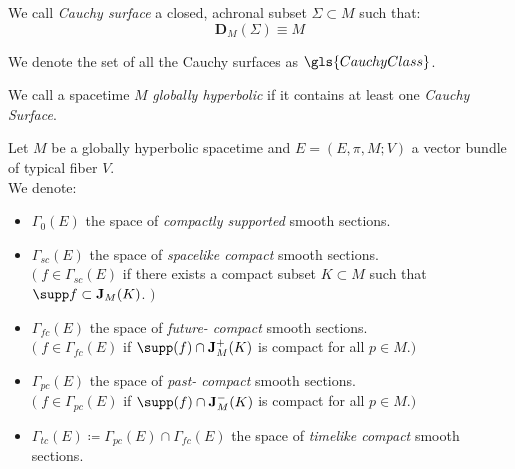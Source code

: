 \documentclass[a4paper,10pt,smallheadings]{scrartcl}
\begin{document}
			\begin{definition}
				We call \emph{Cauchy surface} a closed, achronal subset $\Sigma \subset M$ such that:
				\begin{displaymath}
					\mathbf{D}_M(\Sigma) \equiv M
				\end{displaymath}
			\end{definition}
			
			\begin{notationfix}
				We denote the set of all the Cauchy surfaces as $\gls{CauchyClass}$.
			\end{notationfix}
			
		\begin{definition}\label{Def:GHSP}
			We call a spacetime $M$ \emph{globally hyperbolic} if it contains at least one \emph{Cauchy Surface}.
		\end{definition}					

			\begin{notationfix}
				Let $M$ be a globally hyperbolic spacetime and $E=(E,\pi,M;V)$ a vector bundle of typical fiber $V$.\\
				We denote:
				\begin{itemize}
							\renewcommand\labelitemi{$\cdot$}
					\item $\Gamma_0(E)$ the space of \emph{compactly supported} smooth sections.
					\item $\Gamma_{sc}(E)$  the space of \emph{spacelike compact} smooth sections.\\
						$\big(\; f\in \Gamma_{sc}(E)$ if there exists a compact subset $K \subset M$  such that $\supp f \subset \mathbf{J}_M(K)$. $\big)$
					\item  $\Gamma_{fc}(E) $ the space of \emph{future- compact} smooth sections.\\
						$\big(\; f\in \Gamma_{fc}(E) $ if  $\supp(f) \cap  \mathbf{J}^+_M(K)$ is compact for all $p\in M$.$\big)$
					\item  $\Gamma_{pc}(E) $ the space of \emph{past- compact} smooth sections.\\
						$\big(\; f\in \Gamma_{pc}(E) $ if  $\supp(f) \cap  \mathbf{J}^-_M(K)$ is compact for all $p\in M$.$\big)$
					\item $\Gamma_{tc}(E) \coloneqq \Gamma_{pc}(E) \cap \Gamma_{fc}(E) $ the space of \emph{timelike compact} smooth sections.
				\end{itemize}
			\end{notationfix}
\end{document}
